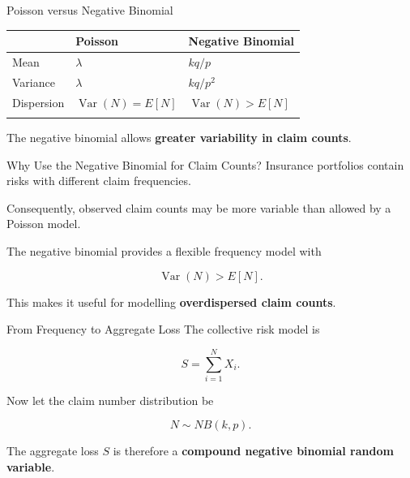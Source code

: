 \documentclass[
  ignorenonframetext,
  aspectratio=169,
]{beamer}
\newcounter{none} %
\begin{document}
\begin{frame}{Poisson versus Negative Binomial}
\protect{}\label{poisson-versus-negative-binomial}
{\def\LTcaptype{none} %
\begin{longtable}[]{@{}
  >{\raggedright\arraybackslash}p{}
  >{\raggedright\arraybackslash}p{}
  >{\raggedright\arraybackslash}p{}@{}}
\toprule\noalign{}
\begin{minipage}[b]{\linewidth}\raggedright
\end{minipage} & \begin{minipage}[b]{\linewidth}\raggedright
Poisson
\end{minipage} & \begin{minipage}[b]{\linewidth}\raggedright
Negative Binomial
\end{minipage} \\
\midrule\noalign{}
\endhead
Mean & \(\lambda\) & \(kq/p\) \\
Variance & \(\lambda\) & \(kq/p^2\) \\
Dispersion & \(\operatorname{Var}(N)=E[N]\) &
\(\operatorname{Var}(N)>E[N]\) \\
\bottomrule\noalign{}
\end{longtable}
}

The negative binomial allows \textbf{greater variability in claim
counts}.
\end{frame}

\begin{frame}{Why Use the Negative Binomial for Claim Counts?}
\protect{}\label{why-use-the-negative-binomial-for-claim-counts}
Insurance portfolios contain risks with different claim frequencies.

Consequently, observed claim counts may be more variable than allowed by
a Poisson model.

The negative binomial provides a flexible frequency model with

\[
\operatorname{Var}(N)>E[N].
\]

This makes it useful for modelling \textbf{overdispersed claim counts}.
\end{frame}

\begin{frame}{From Frequency to Aggregate Loss}
\protect{}\label{from-frequency-to-aggregate-loss}
The collective risk model is

\[
S=\sum_{i=1}^{N}X_i.
\]

Now let the claim number distribution be

\[
N\sim NB(k,p).
\]

The aggregate loss \(S\) is therefore a \textbf{compound negative
binomial random variable}.
\end{frame}
\end{document}
